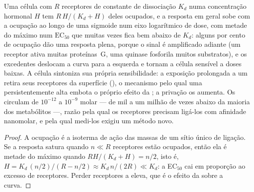 \begin{proposition}\label{prop:b3:endocrinology:dose}
Uma célula com $R$ receptores de constante de dissociação $K_{d}$ numa
concentração hormonal $H$ tem $R\,H/(K_{d} + H)$ deles ocupados, e a
resposta em geral sobe com a ocupação ao longo de uma sigmoide num eixo
logarítmico de dose, com metade do máximo num $\text{EC}_{50}$ que
muitas vezes fica bem abaixo de $K_{d}$: alguns por cento de ocupação
dão uma resposta plena, porque o sinal é amplificado adiante (um
receptor ativa muitas proteínas~G, uma quinase fosforila muitos
substratos), e os \emph{} excedentes deslocam a
curva para a esquerda e tornam a célula sensível a doses baixas. A
célula sintoniza sua própria sensibilidade: a exposição prolongada a um
 retira seus receptores da superfície (\emph{}), o mecanismo pelo qual uma  persistentemente alta
embota o próprio efeito da ; a privação os aumenta. Os 
circulam de $10^{-12}$ a $10^{-9}$ molar --- de mil a um milhão de vezes
abaixo da maioria dos metabólitos ---, razão pela qual os receptores
precisam ligá-los com afinidade nanomolar, e pela qual medi-los exigiu
um método novo.
\end{proposition}
\begin{proof}
A ocupação é a isoterma de ação das massas de um sítio único de ligação.
Se a resposta satura quando $n \ll R$ receptores estão ocupados, então
ela é metade do máximo quando $R H/(K_{d} + H) = n/2$, isto é, $H = K_{d}\,
(n/2)/(R - n/2) \approx K_{d}\, n/(2R) \ll K_{d}$: a EC$_{50}$
cai em proporção ao excesso de receptores. Perder receptores a eleva,
que é o efeito da  sobre a curva.
\end{proof}


